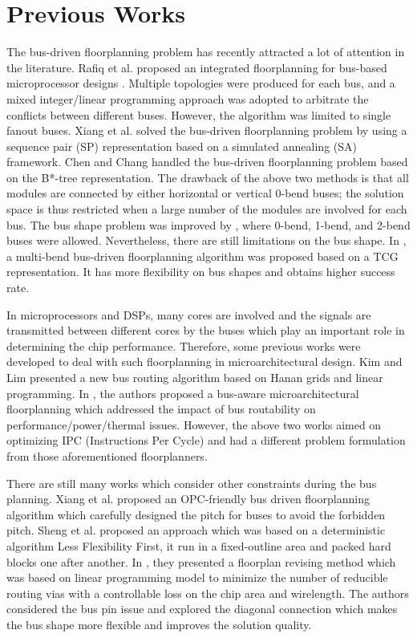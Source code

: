 \section{Previous Works}
\label{sec::Previous Works}
The bus-driven floorplanning problem has recently attracted a lot of
attention in the literature. Rafiq et al. proposed an integrated
floorplanning for bus-based microprocessor designs \cite{Rafiq02}.
Multiple topologies were produced for each bus, and a mixed
integer/linear programming approach was adopted to arbitrate the
conflicts between different buses. However, the algorithm was limited to
single fanout buses. Xiang et al. \cite{Xiang03}
solved the bus-driven floorplanning problem by using a
sequence pair (SP) representation based on a simulated annealing (SA)
framework. Chen and Chang \cite{Chen05} handled the bus-driven
floorplanning problem based on the B*-tree representation. The
drawback of the above two methods is that all modules are
connected by either horizontal or vertical 0-bend buses; the
solution space is thus restricted when a large number of the modules
are involved for each bus.
The bus shape problem was improved by \cite{Law05}, where
0-bend, 1-bend, and 2-bend buses were allowed. Nevertheless, there are still
limitations on the bus shape. In \cite{Ma08}, a
multi-bend bus-driven floorplanning algorithm was proposed based on
a TCG representation. It has more flexibility on bus shapes and
obtains higher success rate.

In microprocessors and DSPs, many cores are involved and the signals
are transmitted between different cores by the buses which
play an important role in determining the chip performance.
Therefore, some previous works were developed to deal with
such floorplanning in microarchitectural design.
Kim and Lim \cite{Kim08_1} presented a new bus routing algorithm
based on Hanan grids and linear programming. In \cite{Kim08_2},
the authors proposed a bus-aware microarchitectural floorplanning
which addressed the impact of bus routability on performance/power/thermal issues.
However, the above two works aimed on optimizing IPC (Instructions Per Cycle) and
had a different problem formulation from those aforementioned
floorplanners.

There are still many works which consider other constraints during the bus planning.
Xiang et al. \cite{Xiang07} proposed an OPC-friendly bus driven
floorplanning algorithm which carefully designed the pitch
for buses to avoid the forbidden pitch.
Sheng et al. \cite{Sheng10} proposed an approach which was based on a deterministic
algorithm Less Flexibility First, it run in a fixed-outline area and packed hard blocks one after another.
In \cite{He10}, they presented a floorplan revising method which was based on linear
programming model to minimize the number of reducible routing vias with a controllable
loss on the chip area and wirelength.
The authors \cite{PH10} considered the bus pin issue and explored the diagonal connection
which makes the bus shape more flexible and improves the solution quality.

